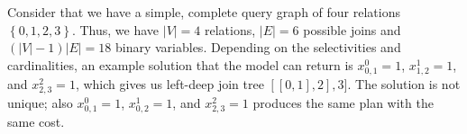 \begin{example}
Consider that we have a simple, complete query graph of four relations $\left\{0,1,2,3\right\}$. Thus, we have $|V| = 4$ relations, $|E| = 6$ possible joins and $(|V| - 1)|E| = 18$ binary variables. Depending on the selectivities and cardinalities, an example solution that the model can return is $x_{0,1}^{0} = 1$, $x_{1,2}^{1} = 1$, and $x_{2,3}^{2} = 1$, which gives us left-deep join tree $[[0, 1], 2], 3]$. The solution is not unique; also $x_{0, 1}^{0} = 1$, $x_{0, 2}^{1} = 1$, and $x_{2, 3}^{2} = 1$ produces the same plan with the same cost.
\end{example}


